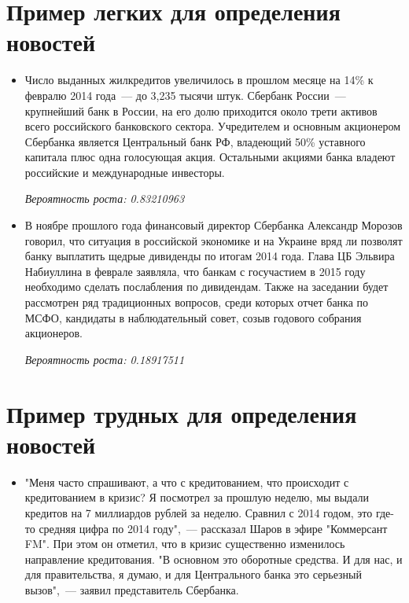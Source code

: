 \documentclass[14pt]{matmex-diploma-custom}
\begin{document}
\begin{appendices}
\section{Пример легких для определения новостей}

\label{news:good}

\begin{itemize}
\item Число выданных жилкредитов увеличилось в прошлом месяце на 14\% к февралю 2014 года~--- до 3,235 тысячи штук. Сбербанк России~--- крупнейший банк в России, на его долю приходится около трети активов всего российского банковского сектора. Учредителем и основным акционером Сбербанка является Центральный банк РФ, владеющий 50\% уставного капитала плюс одна голосующая акция. Остальными акциями банка владеют российские и международные инвесторы.

\emph{Вероятность роста: 0.83210963}

\item В ноябре прошлого года финансовый директор Сбербанка Александр Морозов говорил, что ситуация в российской экономике и на Украине вряд ли позволят банку выплатить щедрые дивиденды по итогам 2014 года. Глава ЦБ Эльвира Набиуллина в феврале заявляла, что банкам с госучастием в 2015 году необходимо сделать послабления по дивидендам. Также на заседании будет рассмотрен ряд традиционных вопросов, среди которых отчет банка по МСФО, кандидаты в наблюдательный совет, созыв годового собрания акционеров.

\emph{Вероятность роста: 0.18917511}
\end{itemize}

\section{Пример трудных для определения новостей}

\label{news:bad}

\begin{itemize}
\item "Меня часто спрашивают, а что с кредитованием, что происходит с кредитованием в кризис? Я посмотрел за прошлую неделю, мы выдали кредитов на 7 миллиардов рублей за неделю. Сравнил с 2014 годом, это где-то средняя цифра по 2014 году",~--- рассказал Шаров в эфире "Коммерсант FM". При этом он отметил, что в кризис существенно изменилось направление кредитования. "В основном это оборотные средства. И для нас, и для правительства, я думаю, и для Центрального банка это серьезный вызов",~--- заявил представитель Сбербанка. 


\end{itemize}
\end{appendices}
\end{document}
